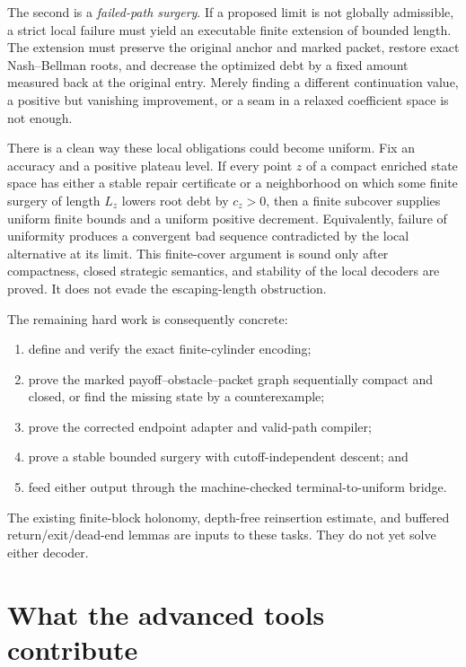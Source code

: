 \documentclass[11pt]{article}
\begin{document}
The second is a \emph{failed-path surgery}.  If a proposed limit is not
globally admissible, a strict local failure must yield an executable finite
extension of bounded length.  The extension must preserve the original
anchor and marked packet, restore exact Nash--Bellman roots, and decrease the
optimized debt by a fixed amount measured back at the original entry.  Merely
finding a different continuation value, a positive but vanishing improvement,
or a seam in a relaxed coefficient space is not enough.

There is a clean way these local obligations could become uniform.  Fix an
accuracy and a positive plateau level.  If every point \(z\) of a compact
enriched state space has either a stable repair certificate or a neighborhood
on which some finite surgery of length \(L_z\) lowers root debt by
\(c_z>0\), then a finite subcover supplies uniform finite bounds and a uniform
positive decrement.  Equivalently, failure of uniformity produces a
convergent bad sequence contradicted by the local alternative at its limit.
This finite-cover argument is sound only after compactness, closed strategic
semantics, and stability of the local decoders are proved.  It does not evade
the escaping-length obstruction.

The remaining hard work is consequently concrete:
\begin{enumerate}
  \item define and verify the exact finite-cylinder encoding;
  \item prove the marked payoff--obstacle--packet graph sequentially compact
        and closed, or find the missing state by a counterexample;
  \item prove the corrected endpoint adapter and valid-path compiler;
  \item prove a stable bounded surgery with cutoff-independent descent; and
  \item feed either output through the machine-checked terminal-to-uniform
        bridge.
\end{enumerate}
The existing finite-block holonomy, depth-free reinsertion estimate, and
buffered return/exit/dead-end lemmas are inputs to these tasks.  They do not
yet solve either decoder.

\section{What the advanced tools contribute}
\end{document}
